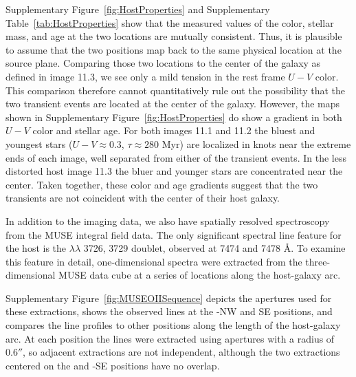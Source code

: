 Supplementary Figure~\ref{fig:HostProperties} and Supplementary
Table~\ref{tab:HostProperties} show that the measured values of the
color, stellar mass, and age at the two \spock locations are mutually
consistent. Thus, it is plausible to assume that the two positions map
back to the same physical location at the source plane.  Comparing
those two locations to the center of the galaxy as defined in image
11.3, we see only a mild tension in the rest frame $U-V$ color. This
comparison therefore cannot quantitatively rule out the possibility
that the two transient events are located at the center of the
galaxy. However, the maps shown in Supplementary Figure~\ref{fig:HostProperties} do
show a gradient in both $U-V$ color and stellar age. For both images
11.1 and 11.2 the bluest and youngest stars ($U-V\approx0.3$,
$\tau\approx280$ Myr) are localized in knots near the extreme ends of
each image, well separated from either of the \spock transient events.
In the less distorted host image 11.3 the bluer and younger stars are
concentrated near the center. Taken together, these color and age
gradients suggest that the two transients are not coincident with the
center of their host galaxy.



In addition to the \HST imaging data, we also have spatially resolved
spectroscopy from the MUSE integral field data.  The only significant
spectral line feature for the \spock host is the 
$\lambda\lambda$ 3726, 3729 doublet, observed at 7474 and 7478 \AA.
To examine this feature in detail, one-dimensional spectra were
extracted from the three-dimensional MUSE data cube at a series of
locations along the \spock host-galaxy arc.

Supplementary Figure~\ref{fig:MUSEOIISequence} depicts the apertures
used for these extractions, shows the observed  lines
at the \spock-NW and SE positions, and compares the 
line profiles to other positions along the length of the host-galaxy
arc.  At each position the lines were extracted using apertures with a
radius of $0.6''$, so adjacent extractions are not independent,
although the two extractions centered on the \spockone and -SE
positions have no overlap.

